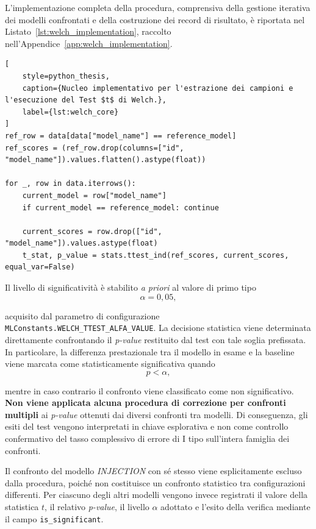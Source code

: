 L'implementazione completa della procedura, comprensiva della gestione iterativa dei modelli confrontati e della costruzione dei record di risultato, è riportata nel Listato~\ref{lst:welch_implementation}, raccolto nell'Appendice~\ref{app:welch_implementation}. 

\begin{lstlisting}[
    style=python_thesis,
    caption={Nucleo implementativo per l'estrazione dei campioni e l'esecuzione del Test $t$ di Welch.},
    label={lst:welch_core}
]
ref_row = data[data["model_name"] == reference_model]
ref_scores = (ref_row.drop(columns=["id", "model_name"]).values.flatten().astype(float))

for _, row in data.iterrows():
    current_model = row["model_name"]
    if current_model == reference_model: continue
    
    current_scores = row.drop(["id", "model_name"]).values.astype(float)
    t_stat, p_value = stats.ttest_ind(ref_scores, current_scores, equal_var=False)
\end{lstlisting}

Il livello di significatività è stabilito \textit{a priori} al valore di primo tipo
\begin{equation}
\alpha = 0{,}05,
\label{eq:welch_alpha}
\end{equation}

acquisito dal parametro di configurazione \texttt{MLConstants.WELCH\_TTEST\_ALFA\_VALUE}. 
La decisione statistica viene determinata direttamente confrontando il \textit{p-value} restituito dal test con tale soglia prefissata. 
In particolare, la differenza prestazionale tra il modello in esame e la baseline viene marcata come statisticamente significativa quando
\begin{equation}
p < \alpha,
\label{eq:welch_decision_rule}
\end{equation}

mentre in caso contrario il confronto viene classificato come non significativo. 
\textbf{Non viene applicata alcuna procedura di correzione per confronti multipli} ai \textit{p-value} ottenuti dai diversi confronti tra modelli. Di conseguenza, gli esiti del test vengono interpretati in chiave esplorativa e non come controllo confermativo del tasso complessivo di errore di I tipo sull'intera famiglia dei confronti.

Il confronto del modello \textit{INJECTION} con sé stesso viene esplicitamente escluso dalla procedura, poiché non costituisce un confronto statistico tra configurazioni differenti. 
Per ciascuno degli altri modelli vengono invece registrati il valore della statistica $t$, il relativo \textit{p-value}, il livello $\alpha$ adottato e l'esito della verifica mediante il campo \texttt{is\_significant}.

